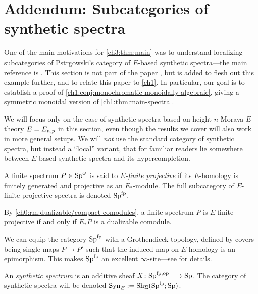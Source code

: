 
\section{Addendum: Subcategories of synthetic spectra}
\label{ch3:addendum}

One of the main motivations for \cref{ch3:thm:main} was to understand localizing subcategories of Pstr\a{}gowski's category of $E$-based synthetic spectra---the main reference is \cite{pstragowski_2022}. This section is not part of the paper \cite{aambo_2024_localizing}, but is added to flesh out this example further, and to relate this paper to \cref{ch1}. In particular, our goal is to establish a proof of \cref{ch1:conj:monochromatic-monoidally-algebraic}, giving a symmetric monoidal version of \cref{ch1:thm:main-spectra}. 

We will focus only on the case of synthetic spectra based on height $n$ Morava $E$-theory $E=E_{n,p}$ in this section, even though the results we cover will also work in more general setups. We will \emph{not} use the standard category of synthetic spectra, but instead a ``local'' variant, that for familiar readers lie somewhere between $E$-based synthetic spectra and its hypercompletion. 

\begin{definition}
    A finite spectrum $P\in \mathrm{Sp}^\omega$ is said to \emph{$E$-finite projective} if its $E$-homology is finitely generated and projective as an $E_{*}$-module. The full subcategory of $E$-finite projective spectra is denoted $\mathrm{Sp}^{\mathrm{fp}}$. 
\end{definition}

\begin{remark}
    By \cref{ch0:rm:dualizable/compact-comodules}, a finite spectrum $P$ is $E$-finite projective if and only if $E_{*}P$ is a dualizable comodule. 
\end{remark}

We can equip the category $\mathrm{Sp}^{\mathrm{fp}}$ with a Grothendieck topology, defined by covers being single maps $P\to P'$ such that the induced map on $E$-homology is an epimorphism. This makes $\mathrm{Sp}^{\mathrm{fp}}$ an excellent $\infty$-site---see \cite[Section 2.3]{pstragowski_2022} for details. 

\begin{definition}
    An \emph{synthetic spectrum} is an additive sheaf $X\colon \mathrm{Sp}^{\mathrm{fp}, \mathrm{op}}\longrightarrow \mathrm{Sp}$. The category of synthetic spectra will be denoted $\mathrm{Syn}_{E} := \mathrm{Sh}_\Sigma(\mathrm{Sp}^{\mathrm{fp}};\mathrm{Sp})$. 
\end{definition}

